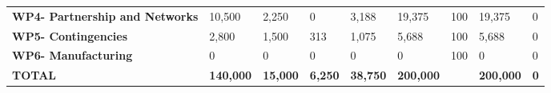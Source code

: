 \begin{landscape}
\begin{table}[H]
{\begin{tabular}{p{5cm}p{2cm}p{2cm}p{2.5cm}p{2cm}p{2cm}p{2cm}p{2cm}p{2cm}}
    \textbf{WP4- Partnership and Networks} & 10,500                                                                          & 2,250                                                                       &0                                                                                          & 3,188                                                                   & 19,375                                                                                  & 100                                                                                & 19,375                            & 0                                                                                  \\
    \textbf{WP5- Contingencies}                                                        & 2,800                                                                           & 1,500                                                                       & 313                                                                                      & 1,075                                                                   & 5,688                                                                                   & 100                                                                                & 5,688                             & 0                                                                                  \\
    \textbf{WP6- Manufacturing}                                                        & 0                                                                               & 0                                                                           &0                                                                                          & 0                                                                       & 0                                                                                       & 100                                                                                & 0                                 & 0                                                                                  \\ \hline
    \textbf{TOTAL}                                                                     & \textbf{140,000}                                                                & \textbf{15,000}                                                             & \textbf{6,250}                                                                           & \textbf{38,750}                                                         & \textbf{200,000}                                                                        & \textbf{}                                                                        & \textbf{200,000}                  & \textbf{0}                                                                         \\ \bottomrule[2pt]
    \end{tabular} }
    \end{table}



\end{landscape}
